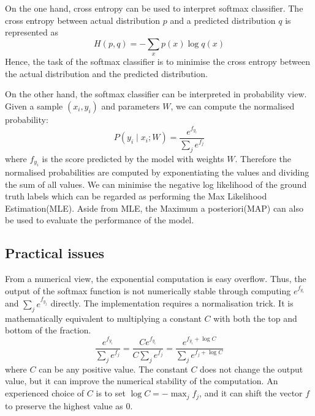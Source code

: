 On the one hand, cross entropy can be used to interpret softmax classifier. The cross entropy between actual  distribution $p$ and a predicted distribution $q$ is represented as
\begin{equation}\label{eq:CrossEntropyDiff}
H(p,q) = - \sum_x p(x) \log q(x)
\end{equation}
Hence, the task of the softmax classifier is to minimise the cross entropy between the actual distribution and the predicted distribution. 

On the other hand, the softmax classifier can be interpreted in probability view. Given a sample $(x_i, y_i)$ and parameters $W$, we can compute the normalised probability:
\begin{equation}\label{eq:ProbInter}
P(y_i \mid x_i; W) = \frac{e^{f_{y_i}}}{\sum_j e^{f_j} }
\end{equation}
where $f_{y_i}$ is the score predicted by the model with weights $W$. Therefore the normalised probabilities are computed by exponentiating the values and dividing the sum of all values. We can minimise the negative log likelihood of the ground truth labels which can be regarded as performing the Max Likelihood Estimation(MLE). Aside from MLE, the Maximum a posteriori(MAP) can also be used to evaluate the performance of the model.

\subsection{Practical issues}

From a numerical view, the exponential computation is easy overflow. Thus, the output of the softmax function is not numerically stable through computing $e^{f_{y_i}}$ and $\sum_j e^{f_{y_j}}$ directly. The implementation requires a normalisation trick. It is mathematically equivalent to multiplying a constant $C$ with both the top and bottom of the fraction.
\begin{equation}\label{eq:SoftmaxTricks}
\frac{e^{f_{y_i}}}{\sum_j e^{f_j}}
= \frac{Ce^{f_{y_i}}}{C\sum_j e^{f_j}}
= \frac{e^{f_{y_i} + \log C}}{\sum_j e^{f_j + \log C}}
\end{equation}
where $C$ can be any positive value. The constant $C$ does not change the output value, but it can improve the numerical stability of the computation. An experienced choice of $C$ is to set $\log C = -\max_j f_j$, and it can shift the vector $f$ to preserve the highest value as $0$.

